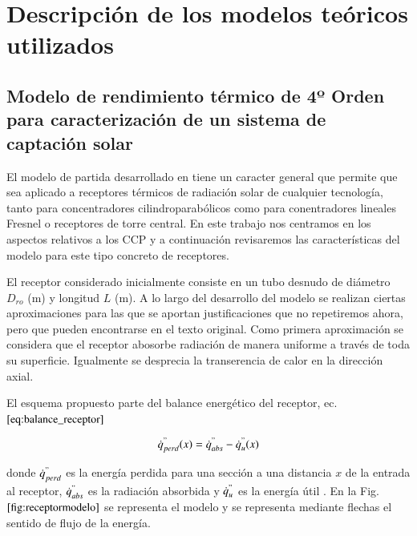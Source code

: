 \chapter{Descripción de los modelos teóricos utilizados}
\label{descripcionmodelos}

\section{Modelo de rendimiento térmico de 4º Orden para caracterización de un sistema de captación solar}
El modelo de partida desarrollado en \cite{barberofresnoDesarrolloModeloTeorico2018} tiene un caracter general que permite que sea aplicado a receptores térmicos de radiación solar de cualquier tecnología, tanto para concentradores cilindroparabólicos como para conentradores lineales Fresnel o receptores de torre central. En este trabajo nos centramos en los aspectos relativos a los CCP y a continuación revisaremos las características del modelo para este tipo concreto de receptores.

El receptor considerado inicialmente consiste en un tubo desnudo de diámetro \(D_{ro}\) (m) y longitud \(L\) (m). A lo largo del desarrollo del modelo se realizan ciertas aproximaciones para las que se aportan justificaciones que no repetiremos ahora, pero que pueden encontrarse en el texto original. Como primera aproximación se considera que el receptor abosorbe radiación de manera uniforme a través de toda su superficie. Igualmente se desprecia la transerencia de calor en la
dirección axial.

El esquema propuesto parte del balance energético del receptor, ec.\(\eqref{eq:balance_receptor}\)

\begin{equation}
    \dot{q}^{"}_{perd}(x) = \dot{q}^{"}_{abs}-\dot{q}^{"}_{u}(x) \label{eq:balance_receptor}
\end{equation}

donde \(\dot{q}^{"}_{perd}\) es la energía perdida para una sección a una distancia \(x\) de la entrada al receptor, \(\dot{q}^{"}_{abs}\) es la radiación absorbida y \(\dot{q}^{"}_{u}\) es la energía útil . En la Fig.\(\ref{fig:receptormodelo}\) se representa el modelo y se representa mediante flechas el sentido de flujo de la energía.

